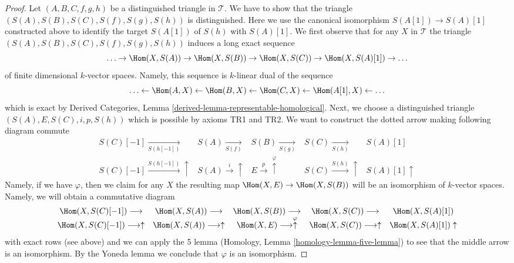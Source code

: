 \begin{proof}
\medskip\noindent
Let $(A, B, C, f, g, h)$ be a distinguished triangle in $\mathcal{T}$.
We have to show that the triangle $(S(A), S(B), S(C), S(f), S(g), S(h))$
is distinguished. Here we use the canonical isomorphism $S(A[1]) \to S(A)[1]$
constructed above to identify the target $S(A[1])$ of $S(h)$ with $S(A)[1]$.
We first observe that for any $X$ in $\mathcal{T}$
the triangle $(S(A), S(B), S(C), S(f), S(g), S(h))$ induces
a long exact sequence
$$
\ldots \to
\Hom(X, S(A)) \to
\Hom(X, S(B)) \to
\Hom(X, S(C)) \to
\Hom(X, S(A)[1]) \to \ldots
$$
of finite dimensional $k$-vector spaces. Namely, this sequence is
$k$-linear dual of the sequence
$$
\ldots \leftarrow
\Hom(A, X) \leftarrow
\Hom(B, X) \leftarrow
\Hom(C, X) \leftarrow
\Hom(A[1], X) \leftarrow
\ldots
$$
which is exact by Derived Categories, Lemma
\ref{derived-lemma-representable-homological}.
Next, we choose a distinguished triangle $(S(A), E, S(C), i, p, S(h))$
which is possible by axioms TR1 and TR2. We want to construct the dotted
arrow making following diagram commute
$$
\begin{array}{ccccc}S(C)[-1] \underset{S(h[-1])}{\longrightarrow} & S(A) \underset{S(f)}{\longrightarrow} & S(B) \underset{S(g)}{\longrightarrow} & S(C) \underset{S(h)}{\longrightarrow} & S(A)[1] \\ S(C)[-1] \overset{S(h[-1])}{\longrightarrow}\uparrow & S(A) \overset{i}{\longrightarrow}\uparrow & E \overset{p}{\longrightarrow}\overset{\varphi}{\uparrow} & S(C) \overset{S(h)}{\longrightarrow}\uparrow & S(A)[1] \uparrow\end{array}
$$
Namely, if we have $\varphi$, then we claim for any $X$ the resulting
map $\Hom(X, E) \to \Hom(X, S(B))$ will be an isomorphism of $k$-vector
spaces. Namely, we will obtain a commutative diagram
$$
\begin{array}{ccccc}\Hom(X, S(C)[-1]) \longrightarrow & \Hom(X, S(A)) \longrightarrow & \Hom(X, S(B)) \longrightarrow & \Hom(X, S(C)) \longrightarrow & \Hom(X, S(A)[1]) \\ \Hom(X, S(C)[-1]) \longrightarrow\uparrow & \Hom(X, S(A)) \longrightarrow\uparrow & \Hom(X, E) \longrightarrow\overset{\varphi}{\uparrow} & \Hom(X, S(C)) \longrightarrow\uparrow & \Hom(X, S(A)[1]) \uparrow\end{array}
$$
with exact rows (see above) and we can apply the 5 lemma
(Homology, Lemma \ref{homology-lemma-five-lemma}) to see
that the middle arrow is an isomorphism. By the Yoneda lemma
we conclude that $\varphi$ is an isomorphism.


\end{proof}

